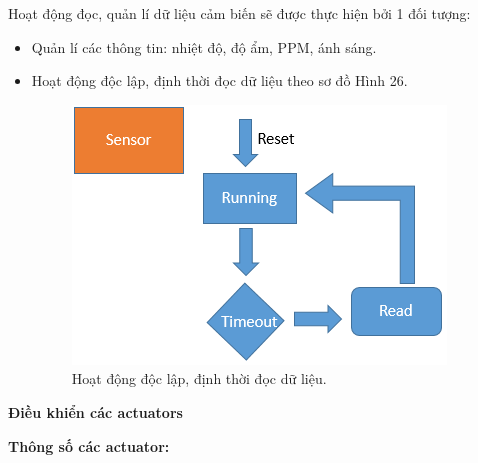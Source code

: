 \documentclass[a4paper,12pt,oneside]{article}
\begin{document}
\noindent Hoạt động đọc, quản lí dữ liệu cảm biến sẽ được thực hiện bởi 1 đối tượng:
\begin{itemize}
\item Quản lí các thông tin: nhiệt độ, độ ẩm, PPM, ánh sáng.
\item Hoạt động độc lập, định thời đọc dữ liệu theo sơ đồ Hình 26.

\begin{figure}[H]
	\centering
	\includegraphics[scale=0.9]{hinh/sensor.PNG}
	\caption{Hoạt động độc lập, định thời đọc dữ liệu.}
\end{figure}

\end{itemize}

\noindent \textbf{Điều khiển các actuators}

\textbf{Thông số các actuator:}
\end{document}
